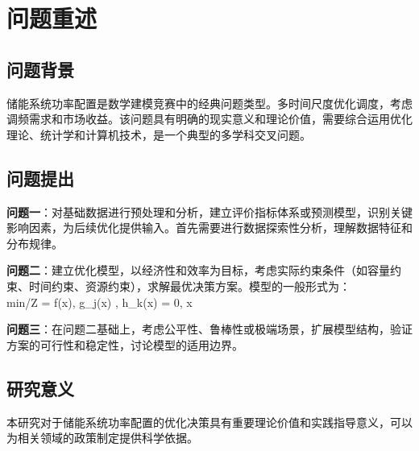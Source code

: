 \newpage
\section{问题重述}

\subsection{问题背景}
储能系统功率配置是数学建模竞赛中的经典问题类型。多时间尺度优化调度，考虑调频需求和市场收益。该问题具有明确的现实意义和理论价值，需要综合运用优化理论、统计学和计算机技术，是一个典型的多学科交叉问题。

\subsection{问题提出}
\textbf{问题一}：对基础数据进行预处理和分析，建立评价指标体系或预测模型，识别关键影响因素，为后续优化提供输入。首先需要进行数据探索性分析，理解数据特征和分布规律。

\textbf{问题二}：建立优化模型，以经济性和效率为目标，考虑实际约束条件（如容量约束、时间约束、资源约束），求解最优决策方案。模型的一般形式为：
\\min/\max \quad Z = f(x), \quad {} \quad g_j(x) , \; h_k(x) = 0, \; x \in {}

\textbf{问题三}：在问题二基础上，考虑公平性、鲁棒性或极端场景，扩展模型结构，验证方案的可行性和稳定性，讨论模型的适用边界。

\subsection{研究意义}
本研究对于储能系统功率配置的优化决策具有重要理论价值和实践指导意义，可以为相关领域的政策制定提供科学依据。
